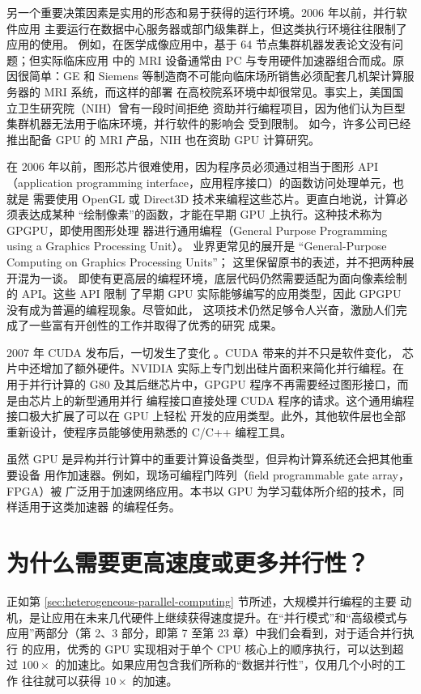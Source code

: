 另一个重要决策因素是实用的形态和易于获得的运行环境。2006 年以前，并行软件应用
主要运行在数据中心服务器或部门级集群上，但这类执行环境往往限制了应用的使用。
例如，在医学成像应用中，基于 64 节点集群机器发表论文没有问题；但实际临床应用
中的 MRI 设备通常由 PC 与专用硬件加速器组合而成。原因很简单：GE 和 Siemens
等制造商不可能向临床场所销售必须配套几机架计算服务器的 MRI 系统，而这样的部署
在高校院系环境中却很常见。事实上，美国国立卫生研究院（NIH）曾有一段时间拒绝
资助并行编程项目，因为他们认为巨型集群机器无法用于临床环境，并行软件的影响会
受到限制。
如今，许多公司已经推出配备 GPU 的 MRI 产品，NIH 也在资助 GPU 计算研究。

在 2006 年以前，图形芯片很难使用，因为程序员必须通过相当于图形 API
（application programming interface，应用程序接口）的函数访问处理单元，也就是
需要使用 OpenGL 或 Direct3D 技术来编程这些芯片。更直白地说，计算必须表达成某种
“绘制像素”的函数，才能在早期 GPU 上执行。这种技术称为 GPGPU，即使用图形处理
器进行通用编程（General Purpose Programming using a Graphics Processing Unit）。
业界更常见的展开是 ``General-Purpose Computing on Graphics Processing Units''；
这里保留原书的表述，并不把两种展开混为一谈。
即使有更高层的编程环境，底层代码仍然需要适配为面向像素绘制的 API。这些 API 限制
了早期 GPU 实际能够编写的应用类型，因此 GPGPU 没有成为普遍的编程现象。尽管如此，
这项技术仍然足够令人兴奋，激励人们完成了一些富有开创性的工作并取得了优秀的研究
成果。

2007 年 CUDA 发布后，一切发生了变化 \cite{cuda2025}。CUDA 带来的并不只是软件变化，
芯片中还增加了额外硬件。NVIDIA 实际上专门划出硅片面积来简化并行编程。在用于并行计算的 G80
及其后继芯片中，GPGPU 程序不再需要经过图形接口，而是由芯片上的新型通用并行
编程接口直接处理 CUDA 程序的请求。这个通用编程接口极大扩展了可以在 GPU 上轻松
开发的应用类型。此外，其他软件层也全部重新设计，使程序员能够使用熟悉的 C/C++
编程工具。

虽然 GPU 是异构并行计算中的重要计算设备类型，但异构计算系统还会把其他重要设备
用作加速器。例如，现场可编程门阵列（field programmable gate array，FPGA）被
广泛用于加速网络应用。本书以 GPU 为学习载体所介绍的技术，同样适用于这类加速器
的编程任务。

\section{为什么需要更高速度或更多并行性？}
\label{sec:why-more-speed}

正如第 \ref{sec:heterogeneous-parallel-computing} 节所述，大规模并行编程的主要
动机，是让应用在未来几代硬件上继续获得速度提升。在“并行模式”和“高级模式与
应用”两部分（第 2、3 部分，即第 7 至第 23 章）中我们会看到，对于适合并行执行
的应用，优秀的 GPU 实现相对于单个 CPU 核心上的顺序执行，可以达到超过
$100\times$ 的加速比。如果应用包含我们所称的“数据并行性”，仅用几个小时的工作
往往就可以获得 $10\times$ 的加速。

